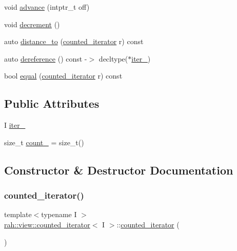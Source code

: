\begin{DoxyCompactItemize}
void \mbox{\hyperlink{structrah_1_1view_1_1counted__iterator_abef44b581abb0c70a79dbd6a61ccd200}{advance}} (intptr\+\_\+t off)
\item 
void \mbox{\hyperlink{structrah_1_1view_1_1counted__iterator_abeb34df8feb243fce3eec27d45b19aa2}{decrement}} ()
\item 
auto \mbox{\hyperlink{structrah_1_1view_1_1counted__iterator_afee4b1d8525979cc4b711eba9b524f1d}{distance\+\_\+to}} (\mbox{\hyperlink{structrah_1_1view_1_1counted__iterator}{counted\+\_\+iterator}} r) const
\item 
auto \mbox{\hyperlink{structrah_1_1view_1_1counted__iterator_aa0478a9f3d2083f2cd9c42d32e8e4dd5}{dereference}} () const -\/$>$ decltype($\ast$\mbox{\hyperlink{structrah_1_1view_1_1counted__iterator_a907dba6ac64293e4c5718e522da4972e}{iter\+\_\+}})
\item 
bool \mbox{\hyperlink{structrah_1_1view_1_1counted__iterator_a71ee9eea167eec16b04373885dbff741}{equal}} (\mbox{\hyperlink{structrah_1_1view_1_1counted__iterator}{counted\+\_\+iterator}} r) const
\end{DoxyCompactItemize}
\subsection*{Public Attributes}
\begin{DoxyCompactItemize}
\item 
I \mbox{\hyperlink{structrah_1_1view_1_1counted__iterator_a907dba6ac64293e4c5718e522da4972e}{iter\+\_\+}}
\item 
size\+\_\+t \mbox{\hyperlink{structrah_1_1view_1_1counted__iterator_a235949f8f72f083b6a65e6f385327d42}{count\+\_\+}} = size\+\_\+t()
\end{DoxyCompactItemize}


\subsection{Constructor \& Destructor Documentation}
\mbox{\label{structrah_1_1view_1_1counted__iterator_a73f275166ac5f41bd93d96ccab15eab0}} 
\subsubsection{\texorpdfstring{counted\_iterator()}{counted\_iterator()}\hspace{0.1cm}{\footnotesize\ttfamily [1/4]}}
{\footnotesize\ttfamily template$<$typename I $>$ \\
\mbox{\hyperlink{structrah_1_1view_1_1counted__iterator}{rah\+::view\+::counted\+\_\+iterator}}$<$ I $>$\+::\mbox{\hyperlink{structrah_1_1view_1_1counted__iterator}{counted\+\_\+iterator}} (\begin{DoxyParamCaption}{ }\end{DoxyParamCaption})\hspace{0.3cm}{\ttfamily [default]}}

